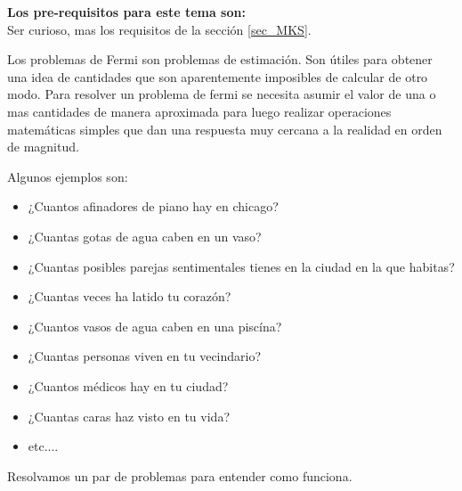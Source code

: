 \begin{prere}
\begin{tcolorbox}[colback=blue!5!white,colframe=blue!75!black,boxrule=0.5pt,arc=4pt, left=6pt,right=6pt,top=6pt,bottom=6pt,boxsep=0pt] 
  \textbf{Los pre-requisitos para este tema son:}\\
  Ser curioso, mas los requisitos de la secci\'on \ref{sec_MKS}.
\end{tcolorbox} 
\end{prere}
Los problemas de Fermi son problemas de estimaci\'on. Son \'utiles para obtener una idea de cantidades que son aparentemente imposibles de calcular de otro modo. Para resolver un problema de fermi se necesita asumir el valor de una o mas cantidades de manera aproximada para luego realizar operaciones matem\'aticas simples que dan una respuesta muy cercana a la realidad en orden de magnitud. 
\begin{example}
\begin{tcolorbox}[colback=green!5!white,colframe=green!75!black,boxrule=0.5pt,arc=4pt,left=6pt,right=6pt,top=6pt,bottom=6pt,boxsep=0pt]
Algunos ejemplos son:\\
\begin{itemize}
\item ¿Cuantos afinadores de piano hay en chicago?
\item ¿Cuantas gotas de agua caben en un vaso?
\item ¿Cuantas posibles parejas sentimentales tienes en la ciudad en la que habitas?
\item ¿Cuantas veces ha latido tu coraz\'on?
\item ¿Cuantos vasos de agua caben en una pisc\'ina?
\item ¿Cuantas personas viven en tu vecindario?
\item ¿Cuantos m\'edicos hay en tu ciudad?
\item ¿Cuantas caras haz visto en tu vida?
\item etc....
\end{itemize}
\end{tcolorbox}

\end{example}
Resolvamos un par de problemas para entender como funciona.\\
